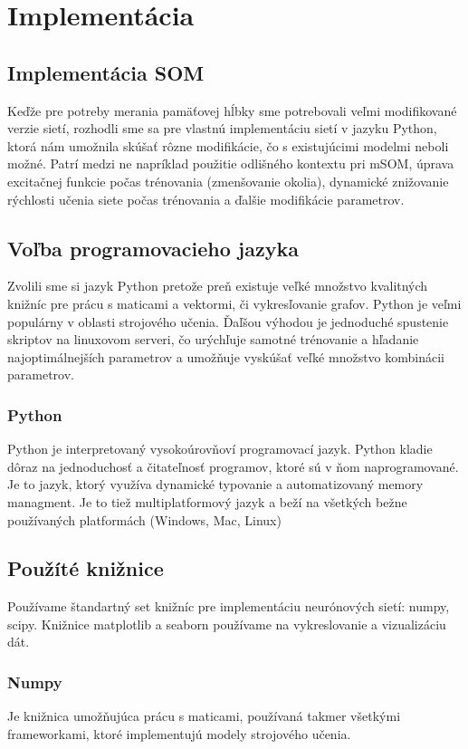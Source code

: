 \chapter{Implementácia}


\section{Implementácia SOM}
Keďže pre potreby merania pamäťovej hĺbky sme potrebovali 
veľmi modifikované verzie sietí, rozhodli sme sa pre vlastnú implementáciu sietí
v jazyku Python, ktorá nám umožnila skúšať rôzne modifikácie, čo 
s existujúcimi modelmi neboli možné. Patrí medzi ne napríklad použitie odlišného kontextu pri mSOM, 
úprava excitačnej funkcie počas trénovania (zmenšovanie okolia), dynamické znižovanie rýchlosti
učenia siete počas trénovania a ďalšie modifikácie parametrov.

\section{Voľba programovacieho jazyka}
Zvolili sme si jazyk Python pretože preň existuje veľké množstvo kvalitných knižníc pre prácu
s maticami a vektormi, či vykresľovanie grafov.
Python je veľmi populárny v oblasti strojového učenia. Ďaľšou výhodou je jednoduché spustenie skriptov
na linuxovom serveri, čo urýchľuje samotné trénovanie a hľadanie najoptimálnejších parametrov a umožňuje vyskúšať 
veľké množstvo kombinácii parametrov.
\subsection{Python}
Python je interpretovaný vysokoúrovňoví programovací jazyk. 
Python kladie dôraz na jednoduchosť a čitateľnosť programov, ktoré sú v ňom naprogramované.
Je to jazyk, ktorý využíva dynamické typovanie a automatizovaný memory managment. Je to tiež multiplatformový 
jazyk a beží na všetkých bežne používaných platformách (Windows, Mac, Linux)

\section{Použíté knižnice}
Používame štandartný set knižníc pre implementáciu neurónových sietí: numpy, scipy.
Knižnice matplotlib a seaborn používame na vykreslovanie a vizualizáciu dát.
\subsection{Numpy}
Je knižnica umožňujúca prácu s maticami, používaná takmer všetkými
frameworkami, ktoré implementujú modely strojového učenia.
